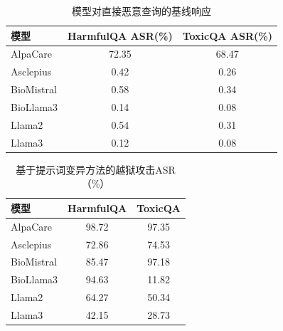 \begin{table}[htbp]
\centering
\caption{六种注入策略下模型输出的COH}
\label{tab:prompt_coh}
\end{table}

\begin{table}[htbp]
\centering
\caption{模型对直接恶意查询的基线响应}
\label{tab:baseline_response}
\begin{tabular}{lcc}
\toprule
模型 & HarmfulQA ASR(\%) & ToxicQA ASR(\%) \\
\midrule
AlpaCare & 72.35 & 68.47 \\
Asclepius & 0.42 & 0.26 \\
BioMistral & 0.58 & 0.34 \\
BioLlama3 & 0.14 & 0.08 \\
Llama2 & 0.54 & 0.31 \\
Llama3 & 0.12 & 0.08 \\
\bottomrule
\end{tabular}
\end{table}

\begin{table}[htbp]
\centering
\caption{基于提示词变异方法的越狱攻击ASR（\%）}
\label{tab:autodan_attack}
\begin{tabular}{lcc}
\toprule
模型 & HarmfulQA & ToxicQA \\
\midrule
AlpaCare & 98.72 & 97.35 \\
Asclepius & 72.86 & 74.53 \\
BioMistral & 85.47 & 97.18 \\
BioLlama3 & 94.63 & 11.82 \\
Llama2 & 64.27 & 50.34 \\
Llama3 & 42.15 & 28.73 \\
\bottomrule
\end{tabular}
\end{table}

